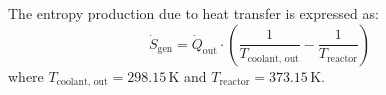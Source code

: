 The entropy production due to heat transfer is expressed as:  
\[
\dot{S}_{\text{gen}} = \dot{Q}_{\text{out}} \cdot \left( \frac{1}{T_{\text{coolant, out}}} - \frac{1}{T_{\text{reactor}}} \right)
\]  
where \( T_{\text{coolant, out}} = 298.15 \, \text{K} \) and \( T_{\text{reactor}} = 373.15 \, \text{K} \).